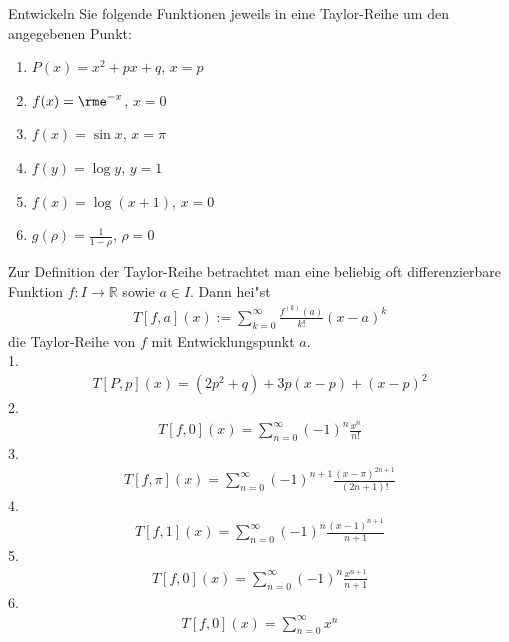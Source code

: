 \documentclass[11pt,answers]{exam}
\begin{document}
\begin{questions}
Entwickeln Sie folgende Funktionen jeweils in eine Taylor-Reihe um den angegebenen Punkt:\\
\parbox{0.5\textwidth}{\begin{enumerate}
\item $P(x)=x^2+px+q$, $x=p$
\item $f(x)=\rme^{-x}$, $x=0$
\item $f(x)=\sin x$, $x=\pi$
\end{enumerate}}\parbox{0.5\textwidth}{\begin{enumerate}\setcounter{enumi}{3}
\item $f(y)=\log y$, $y=1$
\item $f(x)=\log(x+1)$, $x=0$
\item $g(\rho)=\frac{1}{1-\rho}$, $\rho=0$
\end{enumerate}}
\begin{solution} Zur Definition der Taylor-Reihe betrachtet man eine beliebig oft differenzierbare Funktion $f:I\to\mathbb{R}$ sowie $a\in I$. Dann hei"st
\begin{align*}
T[f,a](x):=\sum_{k=0}^\infty\frac{f^{(k)}(a)}{k!}(x-a)^k
\end{align*}
die Taylor-Reihe von $f$ mit Entwicklungspunkt $a$.
\\
1.
\begin{align*}
T[P,p](x)=(2p^2+q)+3p(x-p)+(x-p)^2
\end{align*}
2.
\begin{align*}
T[f,0](x)=\sum_{n=0}^\infty(-1)^n\frac{x^n}{n!}
\end{align*}
3.
\begin{align*}
T[f,\pi](x)=\sum_{n=0}^\infty(-1)^{n+1}\frac{(x-\pi)^{2n+1}}{(2n+1)!}
\end{align*}
4.
\begin{align*}
T[f,1](x)=\sum_{n=0}^\infty(-1)^{n}\frac{(x-1)^{n+1}}{n+1}
\end{align*}
5.
\begin{align*}
T[f,0](x)=\sum_{n=0}^\infty(-1)^{n}\frac{x^{n+1}}{n+1}
\end{align*}
6.
\begin{align*}
T[f,0](x)=\sum_{n=0}^\infty x^n
\end{align*}
\end{solution}





\end{questions}
\end{document}
